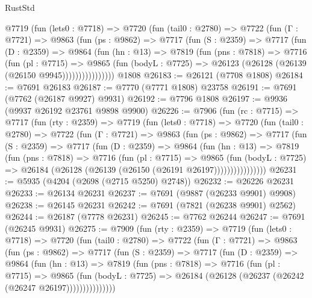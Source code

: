 \begin{lexlean}{RustStd}
\begin{coremodule}
        @7719
          (fun (lets0 : @7718) =>
          @7720
            (fun (tail0 : @2780) =>
            @7722
              (fun (Γ : @7721) =>
              @9863
                (fun (ps : @9862) =>
                @7717
                  (fun (S : @2359) =>
                  @7717
                    (fun (D : @2359) =>
                    @9864
                      (fun (hn : @13) =>
                      @7819
                        (fun (pns : @7818) =>
                        @7716
                          (fun (pl : @7715) =>
                          @9865
                            (fun (bodyL : @7725) =>
                            @26123 (@26128 (@26139 (@26150 @9945))))))))))))))))
    @1808
@26183 := @26121 (@7708 @1808)
@26184 := @7691 @26183
@26187 := @7770 (@7771 @1808) @23758
@26191 := @7691 (@7762 (@26187 @9927) @9931)
@26192 := @7796 @1808
@26197 := @9936 (@9937 @26192 @23761 @9898 @9900)
@26226 := @7906
    (fun (rc : @7715) =>
    @7717
      (fun (rty : @2359) =>
      @7719
        (fun (lets0 : @7718) =>
        @7720
          (fun (tail0 : @2780) =>
          @7722
            (fun (Γ : @7721) =>
            @9863
              (fun (ps : @9862) =>
              @7717
                (fun (S : @2359) =>
                @7717
                  (fun (D : @2359) =>
                  @9864
                    (fun (hn : @13) =>
                    @7819
                      (fun (pns : @7818) =>
                      @7716
                        (fun (pl : @7715) =>
                        @9865
                          (fun (bodyL : @7725) =>
                          @26184 (@26128 (@26139 (@26150 (@26191 @26197))))))))))))))))
@26231 := @5935 (@4204 (@2698 (@2715 @5250) @2748))
@26232 := @26226 @26231
@26233 := @26134 @26231
@26237 := @7691 (@9887 (@26233 @9901) @9908)
@26238 := @26145 @26231
@26242 := @7691 (@7821 (@26238 @9901) @2562)
@26244 := @26187 (@7778 @26231)
@26245 := @7762 @26244
@26247 := @7691 (@26245 @9931)
@26275 := @7909
    (fun (rty : @2359) =>
    @7719
      (fun (lets0 : @7718) =>
      @7720
        (fun (tail0 : @2780) =>
        @7722
          (fun (Γ : @7721) =>
          @9863
            (fun (ps : @9862) =>
            @7717
              (fun (S : @2359) =>
              @7717
                (fun (D : @2359) =>
                @9864
                  (fun (hn : @13) =>
                  @7819
                    (fun (pns : @7818) =>
                    @7716
                      (fun (pl : @7715) =>
                      @9865
                        (fun (bodyL : @7725) =>
                        @26184 (@26128 (@26237 (@26242 (@26247 @26197)))))))))))))))

\end{coremodule}
\end{lexlean}
